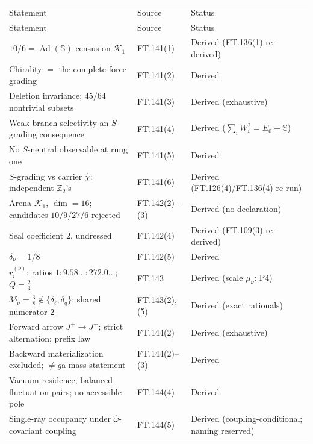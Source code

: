 {\footnotesize\setlength{\tabcolsep}{4pt}
\begin{longtable}{>{\raggedright\arraybackslash}p{}|>{\raggedright\arraybackslash}p{}|>{\raggedright\arraybackslash}p{}}
\toprule
Statement & Source & Status \\
\addlinespace[2pt]
\midrule
\endfirsthead
\toprule
Statement & Source & Status \\
\addlinespace[2pt]
\midrule
\endhead
\bottomrule
\endlastfoot
$10/6=\allowbreak \operatorname{Ad}(\mathbb S)$ census on $\mathcal K_1$ & FT.141(1) & Derived (FT.136(1) re-derived) \\
Chirality $=$ the complete-force grading & FT.141(2) & Derived \\
Deletion invariance; $45/64$ nontrivial subsets & FT.141(3) & Derived (exhaustive) \\
Weak branch selectivity an $S$-grading consequence & FT.141(4) & Derived ($\sum_iW_i^2=\allowbreak E_0+\allowbreak \mathbb S$) \\
No $S$-neutral observable at rung one & FT.141(5) & Derived \\
$S$-grading vs carrier $\hat\chi$: independent $\mathbb Z_2$'s & FT.141(6) & Derived (FT.126(4)/FT.136(4) re-run) \\
Arena $\mathcal K_1$, $\dim=\allowbreak 16$; candidates $10/9/27/6$ rejected & FT.142(2)–(3) & Derived (no declaration) \\
Seal coefficient $2$, undressed & FT.142(4) & Derived (FT.109(3) re-derived) \\
$\delta_\nu=\allowbreak 1/8$ & FT.142(5) & Derived \\
$r_i^{(\nu)}$; ratios $1:9.58\ldots:272.0\ldots$; $Q=\allowbreak \tfrac23$ & FT.143 & Derived (scale $\mu_\nu$: P4) \\
$3\delta_\nu=\allowbreak \tfrac38\notin\{\delta_\ell,\delta_q\}$; shared numerator $2$ & FT.143(2), (5) & Derived (exact rationals) \\
Forward arrow $J^+\allowbreak \to J^-$; strict alternation; prefix law & FT.144(2) & Derived (exhaustive) \\
Backward materialization excluded; $\ne\allowbreak g$a mass statement & FT.144(2)–(3) & Derived \\
Vacuum residence; balanced fluctuation pairs; no accessible pole & FT.144(4) & Derived \\
Single-ray occupancy under $\hat\omega$-covariant coupling & FT.144(5) & Derived (coupling-conditional; naming reserved) \\

\end{longtable}}
